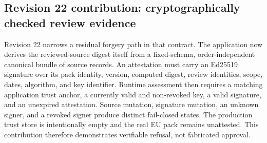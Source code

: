 \subsection{Revision 22 contribution: cryptographically checked review evidence}

Revision 22 narrows a residual forgery path in that contract. The application now derives the reviewed-source digest itself from a fixed-schema, order-independent canonical bundle of source records. An attestation must carry an Ed25519 signature over its pack identity, version, computed digest, review identities, scope, dates, algorithm, and key identifier. Runtime assessment then requires a matching application trust anchor, a currently valid and non-revoked key, a valid signature, and an unexpired attestation. Source mutation, signature mutation, an unknown signer, and a revoked signer produce distinct fail-closed states. The production trust store is intentionally empty and the real EU pack remains unattested. This contribution therefore demonstrates verifiable refusal, not fabricated approval.
